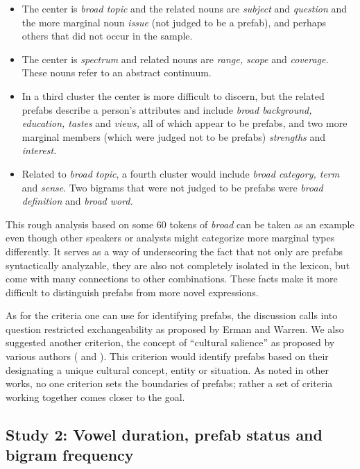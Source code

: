\documentclass[output=paper]{langscibook}
\begin{document}
\begin{itemize}
\item The center is \textit{broad topic} and the related nouns are \textit{subject} and \textit{question} and the more marginal noun \textit{issue} (not judged to be a prefab), and perhaps others that did not occur in the sample.

\item The center is \textit{spectrum} and related nouns are \textit{range, scope} and \textit{coverage.} These nouns refer to an abstract continuum.

\item In a third cluster the center is more difficult to discern, but the related prefabs describe a person’s attributes and include \textit{broad background, education, tastes} and \textit{views,} all of which appear to be prefabs, and two more marginal members (which were judged not to be prefabs) \textit{strengths} and \textit{interest.}

\item Related to \textit{broad topic}, a fourth cluster would include \textit{broad category, term} and \textit{sense}. Two bigrams that were not judged to be prefabs were \textit{broad definition} and \textit{broad word.}

\end{itemize}

This rough analysis based on some 60 tokens of \textit{broad} can be taken as an example even though other speakers or analysts might categorize more marginal types differently. It serves as a way of underscoring the fact that not only are prefabs syntactically analyzable, they are also not completely isolated in the lexicon, but come with many connections to other combinations. These facts make it more difficult to distinguish prefabs from more novel expressions. 

As for the criteria one can use for identifying prefabs, the discussion calls into question restricted exchangeability as proposed by Erman and Warren. We also suggested another criterion, the concept of ``cultural salience'' as proposed by various authors (\citealt{Pawley1986} and \citealt{Hoffman2004}). This criterion would identify prefabs based on their designating a unique cultural concept, entity or situation. As noted in other works, no one criterion sets the boundaries of prefabs; rather a set of criteria working together comes closer to the goal.

\subsection{Study 2: Vowel duration, prefab status and bigram frequency}\label{sec:bybee:3.2}
\end{document}
